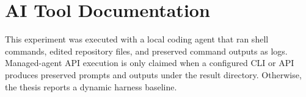 \chapter{AI Tool Documentation}

This experiment was executed with a local coding agent that ran shell commands, edited repository files, and preserved command outputs as logs. Managed-agent API execution is only claimed when a configured CLI or API produces preserved prompts and outputs under the result directory. Otherwise, the thesis reports a dynamic harness baseline.
